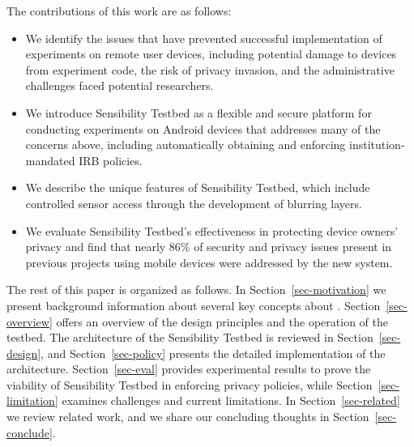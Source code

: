 The contributions of this work are as follows:

\begin{itemize}\setlength\itemsep{0em}
\item We identify the issues that have prevented successful implementation
of experiments on remote user devices, including potential damage to
devices from experiment code, the risk of privacy invasion, and the
administrative challenges faced potential researchers. 

\item We introduce Sensibility Testbed as a flexible and secure platform for
conducting experiments on Android devices that addresses many of the
concerns above, including automatically obtaining and enforcing 
institution-mandated IRB policies.

\item We describe the unique features of Sensibility Testbed, which include 
controlled sensor access through the development of blurring layers.

\item We evaluate Sensibility Testbed's effectiveness in
protecting device owners' privacy and find that nearly 86\% of
security and privacy issues present in previous projects using 
mobile devices were addressed by the new system.
\end{itemize}

The rest of this paper is organized as follows. In Section~\ref{sec-motivation} we
present background information about several key concepts about \sysname. 
Section~\ref{sec-overview} offers an overview of the design principles 
and the operation of the testbed. The architecture of the Sensibility Testbed 
is reviewed in Section~\ref{sec-design}, and Section~\ref{sec-policy} 
presents the detailed implementation of the architecture. 
Section~\ref{sec-eval} provides experimental results to prove the
viability of Sensibility Testbed in enforcing privacy policies, while
Section~\ref{sec-limitation} examines challenges and current limitations. 
In Section~\ref{sec-related} we review related work,
and we share our concluding thoughts in Section~\ref{sec-conclude}.

